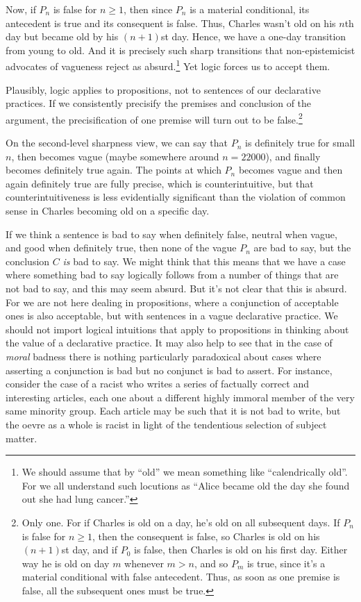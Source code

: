 Now, if $P_n$ is false for $n\ge 1$, then since $P_n$ is a material conditional, its 
antecedent is true and its consequent is false. Thus, Charles wasn't old on his $n$th
day but became old by his $(n+1)$st day. Hence, we have a one-day transition from 
young to old. And it is precisely such sharp transitions that non-epistemicist advocates
of vagueness reject as absurd.\footnote{We should assume that by ``old'' we mean something like
``calendrically old''. For we all understand such locutions as ``Alice became old the
day she found out she had lung cancer.''} Yet logic forces us to accept them.

Plausibly, logic applies to propositions, not to 
sentences of our declarative practices. If we consistently precisify the premises and conclusion
of the argument, the precisification of one premise will turn out to be false.\footnote{Only one. For if Charles is old
on a day, he's old on all subsequent days. If $P_n$ is false for $n\ge 1$, then the consequent
is false, so Charles is old on his $(n+1)$st day, and if $P_0$ is false, then Charles is old on
his first day. Either way he is old on day $m$ whenever $m>n$, and
so $P_m$ is true, since it's a material conditional with false antecedent. Thus, as soon as one
premise is false, all the subsequent ones must be true.} 

On the second-level sharpness view, we can say that $P_n$ is definitely true for small $n$,
then becomes vague (maybe somewhere around $n=22000$), and finally becomes definitely true again. 
The points at which $P_n$ becomes vague and then again definitely true are fully precise, which is 
counterintuitive, but that counterintuitiveness is less evidentially significant than the 
violation of common sense in Charles becoming old on a specific day.

If we think a sentence is bad to say when definitely false, neutral when vague, and good when
definitely true, then none of the vague $P_n$ are bad to say, but the conclusion $C$ \textit{is} bad
to say. We might think that this means that we have a case where something bad to say logically
follows from a number of things that are not bad to say, and this may seem absurd. But
it's not clear that this is absurd. For we are not here dealing in propositions, where a conjunction
of acceptable ones is also acceptable, but with sentences in a vague declarative practice. We should
not import logical intuitions that apply to propositions in thinking about the value of a declarative
practice. It may also help to see that in the case of \textit{moral} badness there is nothing particularly
paradoxical about cases where asserting a conjunction is bad but no conjunct is bad to assert. For instance,
consider the case of a racist who writes a series of factually correct and interesting articles, each one 
about a different highly immoral member of the very same minority group. Each
article may be such that it is not bad to write, but the oevre as a whole is racist in light of 
the tendentious selection of subject matter.	

